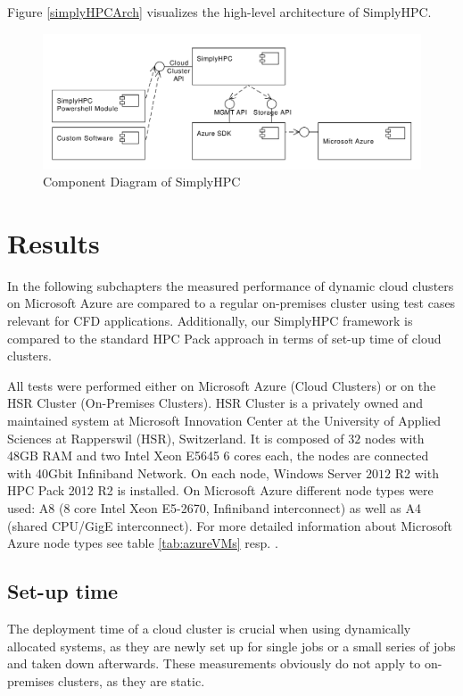 \documentclass[3p,times]{elsarticle}
\begin{document}
Figure \ref{simplyHPCArch} visualizes the high-level architecture of SimplyHPC.

\begin{figure}[h]
\centering
	\includegraphics[width=.8\linewidth]{simplyHPCArch}
	\caption{Component Diagram of SimplyHPC}
	\label{fig:simplyHPCArch}
\end{figure}


\section{Results}
\label{sec:results}
In the following subchapters the measured performance of dynamic cloud clusters on Microsoft Azure are compared to a regular on-premises cluster using test cases relevant for CFD applications. Additionally, our SimplyHPC framework is compared to the standard HPC Pack approach in terms of set-up time of cloud clusters.

All tests were performed either on Microsoft Azure (Cloud Clusters) or on the HSR Cluster (On-Premises Clusters). HSR Cluster is a privately owned and maintained system at Microsoft Innovation Center at the University of Applied Sciences at Rapperswil (HSR), Switzerland. It is composed of $32$ nodes with 48GB RAM and two Intel Xeon E5645 6 cores each, the nodes are connected with 40Gbit Infiniband Network. On each node, Windows Server $2012$ R2 with HPC Pack 2012 R2 is installed.
On Microsoft Azure different node types were used: A8 (8 core Intel Xeon E5-2670, Infiniband interconnect) as well as A4 (shared CPU/GigE interconnect). For more detailed information about Microsoft Azure node types see table \ref{tab:azureVMs} resp. \cite{azure}.

\subsection{Set-up time}
The deployment time of a cloud cluster is crucial when using dynamically allocated systems, as they are newly set up for single jobs or a small series of jobs and taken down afterwards. These measurements obviously do not apply to on-premises clusters, as they are static.
\end{document}
